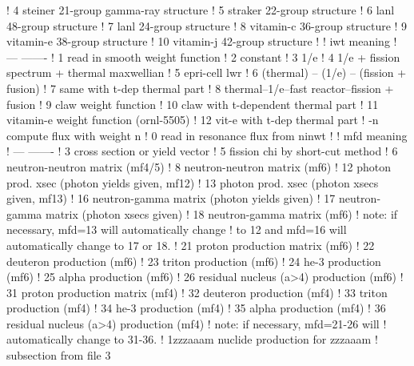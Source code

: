 \begin{ccode}
   !      4           steiner 21-group gamma-ray structure
   !      5           straker 22-group structure
   !      6           lanl 48-group structure
   !      7           lanl 24-group structure
   !      8           vitamin-c 36-group structure
   !      9           vitamin-e 38-group structure
   !     10           vitamin-j 42-group structure
   !
   !     iwt          meaning
   !     ---          -------
   !      1           read in smooth weight function
   !      2           constant
   !      3           1/e
   !      4           1/e + fission spectrum + thermal maxwellian
   !      5           epri-cell lwr
   !      6           (thermal) -- (1/e) -- (fission + fusion)
   !      7           same with t-dep thermal part
   !      8           thermal--1/e--fast reactor--fission + fusion
   !      9           claw weight function
   !     10           claw with t-dependent thermal part
   !     11           vitamin-e weight function (ornl-5505)
   !     12           vit-e with t-dep thermal part
   !     -n           compute flux with weight n
   !      0           read in resonance flux from ninwt
   !
   !     mfd          meaning
   !     ---          -------
   !      3           cross section or yield vector
   !      5           fission chi by short-cut method
   !      6           neutron-neutron matrix (mf4/5)
   !      8           neutron-neutron matrix (mf6)
   !     12           photon prod. xsec (photon yields given, mf12)
   !     13           photon prod. xsec (photon xsecs given, mf13)
   !     16           neutron-gamma matrix (photon yields given)
   !     17           neutron-gamma matrix (photon xsecs given)
   !     18           neutron-gamma matrix (mf6)
   !         note: if necessary, mfd=13 will automatically change
   !         to 12 and mfd=16 will automatically change to 17 or 18.
   !     21           proton production matrix (mf6)
   !     22           deuteron production (mf6)
   !     23           triton production (mf6)
   !     24           he-3 production (mf6)
   !     25           alpha production (mf6)
   !     26           residual nucleus (a>4) production (mf6)
   !     31           proton production matrix (mf4)
   !     32           deuteron production (mf4)
   !     33           triton production (mf4)
   !     34           he-3 production (mf4)
   !     35           alpha production (mf4)
   !     36           residual nucleus (a>4) production (mf4)
   !          note: if necessary, mfd=21-26 will
   !          automatically change to 31-36.
   !    1zzzaaam       nuclide production for zzzaaam
   !                     subsection from file 3

\end{ccode}
